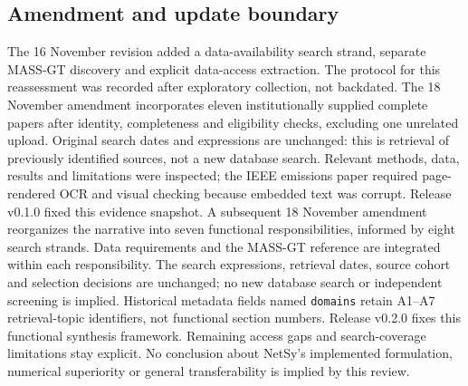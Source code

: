 \subsection{Amendment and update boundary}
The 16 November revision added a data-availability search strand, separate
MASS-GT discovery and explicit data-access extraction. The protocol for this
reassessment was recorded after exploratory collection, not backdated. The
18 November amendment incorporates eleven institutionally supplied complete
papers after identity, completeness and eligibility checks, excluding one
unrelated upload. Original search dates and expressions are unchanged: this is
retrieval of previously identified sources, not a new database search. Relevant
methods, data, results and limitations were inspected; the IEEE emissions paper
required page-rendered OCR and visual checking because embedded text was corrupt.
Release v0.1.0 fixed this evidence snapshot. A subsequent 18 November
amendment reorganizes the narrative into seven functional responsibilities,
informed by eight search strands. Data requirements and the MASS-GT reference
are integrated within each responsibility. The search expressions, retrieval
dates, source cohort and selection decisions are unchanged; no new database
search or independent screening is implied. Historical metadata fields named
\texttt{domains} retain A1--A7 retrieval-topic identifiers, not functional
section numbers. Release v0.2.0 fixes this functional synthesis framework.
Remaining access gaps and search-coverage limitations stay explicit. No conclusion about NetSy's
implemented formulation, numerical superiority or general transferability is
implied by this review.

